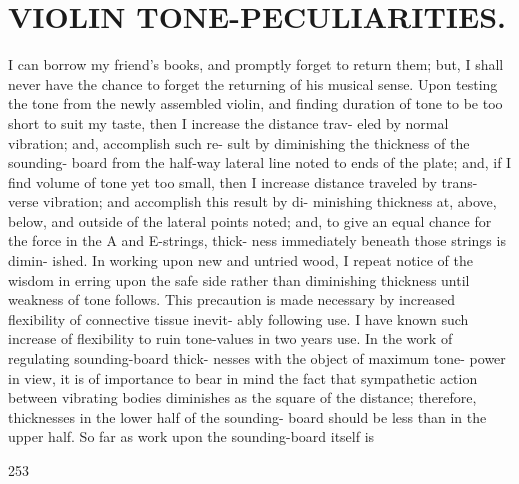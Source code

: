 \documentclass{article}
\begin{document}
\section*{VIOLIN TONE-PECULIARITIES.}
I can borrow my friend's books, and promptly forget to return them; but, I shall never have the chance to forget the returning of his musical sense. Upon testing the tone from the newly assembled violin, and finding duration of tone to be too short to suit my taste, then I increase the distance trav- eled by normal vibration; and, accomplish such re- sult by diminishing the thickness of the sounding- board from the half-way lateral line noted to ends of the plate; and, if I find volume of tone yet too small, then I increase distance traveled by trans- verse vibration; and accomplish this result by di- minishing thickness at, above, below, and outside of the lateral points noted; and, to give an equal chance for the force in the A and E-strings, thick- ness immediately beneath those strings is dimin- ished. In working upon new and untried wood, I repeat notice of the wisdom in erring upon the safe side rather than diminishing thickness until weakness of tone follows. This precaution is made necessary by increased flexibility of connective tissue inevit- ably following use. I have known such increase of flexibility to ruin tone-values in two years use. In the work of regulating sounding-board thick- nesses with the object of maximum tone- power in view, it is of importance to bear in mind the fact that sympathetic action between vibrating bodies diminishes as the square of the distance; therefore, thicknesses in the lower half of the sounding- board should be less than in the upper half. So far as work upon the sounding-board itself is

253
\end{document}
